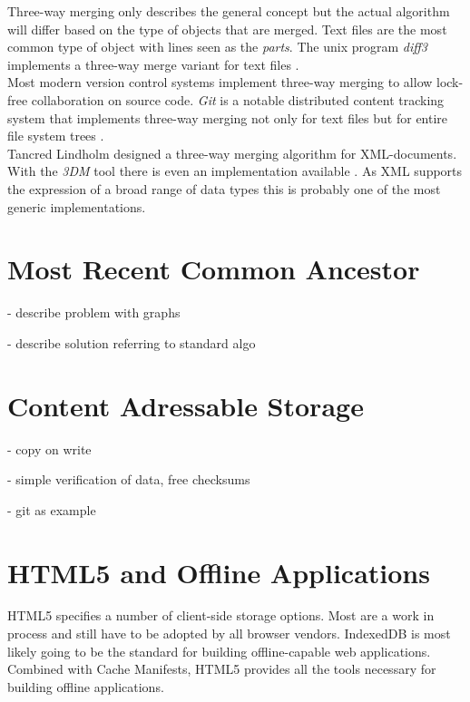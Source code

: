 Three-way merging only describes the general concept but the actual algorithm will differ based on the type of objects that are merged.
Text files are the most common type of object with lines seen as the \emph{parts}.
The unix program \emph{diff3} implements a three-way merge variant for text files \cite{diff3}.\\
Most modern version control systems implement three-way merging to allow lock-free collaboration on source code.
\emph{Git} is a notable distributed content tracking system that implements three-way merging not only for text files but for entire file system trees \cite{git}.\\

Tancred Lindholm designed a three-way merging algorithm for XML-documents.
With the \emph{3DM} tool there is even an implementation available \cite{Lindholm:2001uv}.
As XML supports the expression of a broad range of data types this is probably one of the most generic implementations.

\section{Most Recent Common Ancestor}
- describe problem with graphs

- describe solution referring to standard algo

\section{Content Adressable Storage}
- copy on write

- simple verification of data, free checksums

- git as example

\section{HTML5 and Offline Applications}
HTML5 specifies a number of client-side storage options. Most are a work in process and still have to be adopted by all browser vendors. IndexedDB is most likely going to be the standard for building offline-capable web applications. Combined with Cache Manifests, HTML5 provides all the tools necessary for building offline applications.

